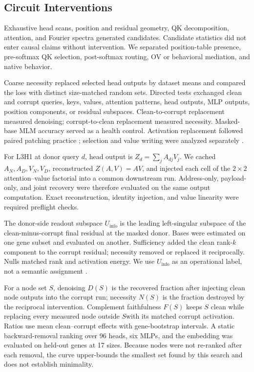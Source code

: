 \documentclass{article}
\newcommand{\Uinfo}{\ensuremath{U_{\mathrm{info}}}}
\begin{document}
\subsection{Circuit Interventions}
\label{sec:circuit-methods}

Exhaustive head scans, position and residual geometry, QK decomposition, attention, and Fourier spectra generated candidates. Candidate statistics did not enter causal claims without intervention. We separated position-table presence, pre-softmax QK selection, post-softmax routing, OV or behavioral mediation, and native behavior.

Coarse necessity replaced selected head outputs by dataset means and compared the loss with distinct size-matched random sets. Directed tests exchanged clean and corrupt queries, keys, values, attention patterns, head outputs, MLP outputs, position components, or residual subspaces. Clean-to-corrupt replacement measured denoising; corrupt-to-clean replacement measured necessity. Masked-base MLM accuracy served as a health control. Activation replacement followed paired patching practice \citep{zhang2024patching,
heimersheim2024patching}; selection and value writing were analyzed separately
\citep{elhage2021framework}.

For L3H1 at donor query \(d\), head output is \(Z_d=\sum_j A_{dj}V_j\). We cached \(A_N,A_D,V_N,V_D\), reconstructed \(Z(A,V)=AV\), and injected each cell of the \(2\times2\) attention--value factorial into a common downstream run. Address-only, payload-only, and joint recovery were therefore evaluated on the same output computation. Exact reconstruction, identity injection, and value linearity were required preflight checks.

The donor-side readout subspace \(\Uinfo\) is the leading left-singular subspace of the clean-minus-corrupt final residual at the masked donor. Bases were estimated on one gene subset and evaluated on another. Sufficiency added the clean rank-\(k\) component to the corrupt residual; necessity removed or replaced it reciprocally. Nulls matched rank and activation energy. We use \(\Uinfo\) as an operational label, not a semantic assignment \citep{makelov2024subspace}.

For a node set \(S\), denoising \(D(S)\) is the recovered fraction after injecting clean node outputs into the corrupt run; necessity \(N(S)\) is the fraction destroyed by the reciprocal intervention. Complement faithfulness \(F(S)\) keeps \(S\) clean while replacing every measured node outside \(S\)with its matched corrupt activation. Ratios use mean clean--corrupt effects with gene-bootstrap intervals. A static backward-removal ranking over 96 heads, six MLPs, and the embedding was evaluated on held-out genes at 17 sizes. Because nodes were not re-ranked after each removal, the curve upper-bounds the smallest set found by this search and does not establish minimality.
\end{document}
